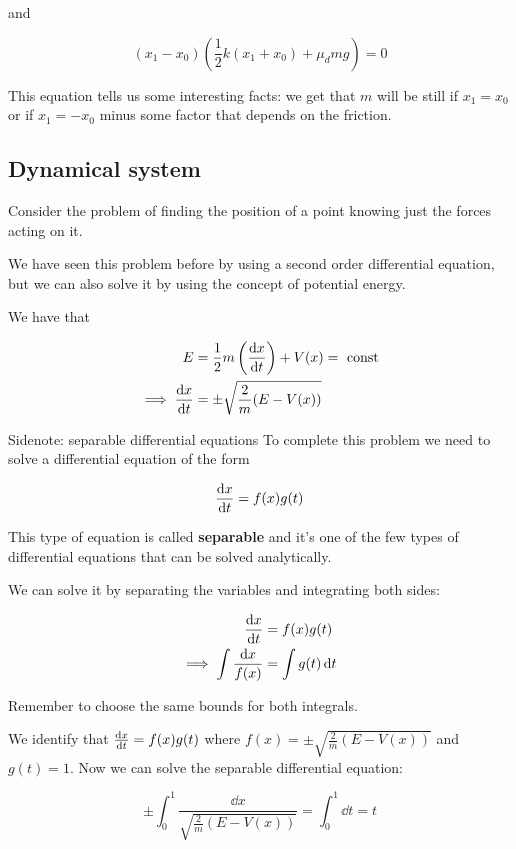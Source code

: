 \documentclass[10pt]{extarticle}
\begin{document}
and

$$
  (x_1 - x_0) \left( \frac{1}{2} k (x_1 + x_0) + \mu_d m g \right) = 0
$$

This equation tells us some interesting facts:
we get that $m$ will be still if $x_1 = x_0$ or if $x_1 = -x_0$ minus some factor that depends on the friction.

\subsection{Dynamical system}

Consider the problem of finding the position of a point knowing just the forces acting on it.

We have seen this problem before by using a second order differential equation, but we can also solve it by using the concept of potential energy.

We have that

\begin{align*}
  E                  & = \frac{1}{2} m \left( \dv{x}{t} \right) + V(x) = \text{ const} \\
  \implies \dv{x}{t} & = \pm \sqrt{\frac{2}{m} (E - V(x))}
\end{align*}

\begin{bluebox}{Sidenote: separable differential equations}
  To complete this problem we need to solve a differential equation of the form

  $$
    \dv{x}{t} = f(x) g(t)
  $$

  This type of equation is called \textbf{separable} and it's one of the few types of differential equations that can be solved analytically.

  We can solve it by separating the variables and integrating both sides:

  \begin{align*}
    \dv{x}{t}                         & = f(x) g(t)        \\
    \implies \int \frac{\dd{x}}{f(x)} & = \int g(t) \dd{t}
  \end{align*}

  Remember to choose the same bounds for both integrals.
\end{bluebox}

We identify that $\dv{x}{t} = f(x)g(t)$ where $f(x) = \pm \sqrt{\frac{2}{m} (E - V(x))}$ and $g(t) = 1$.
Now we can solve the separable differential equation:

$$
  \pm \int_0^1 \frac{\dd{x}}{\sqrt{\frac{2}{m} (E - V(x))}} = \int_0^1 \dd{t} = t
$$
\end{document}
